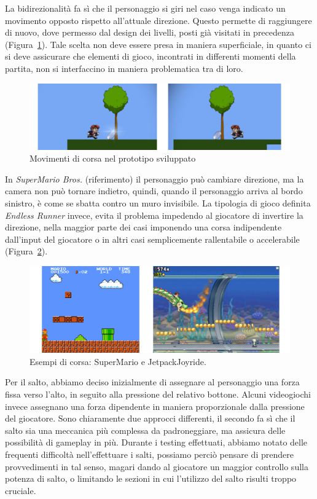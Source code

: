 La bidirezionalità fa sì che il personaggio si giri nel caso venga indicato un movimento opposto rispetto all’attuale direzione. Questo permette di raggiungere di nuovo, dove permesso dal design dei livelli, posti già visitati in precedenza (Figura~\ref{fig:platform_corsa}). Tale scelta non deve essere presa in maniera superficiale, in quanto ci si deve assicurare che elementi di gioco, incontrati in differenti momenti della partita, non si interfaccino in maniera problematica tra di loro. 
\begin{figure}%
	\centering
	\includegraphics[width= \columnwidth]{images/gameDesign/03.jpg}
	\caption{Movimenti di corsa nel prototipo sviluppato}
	\label{fig:platform_corsa}
\end{figure}
In \textit{SuperMario Bros.} (riferimento) il personaggio può cambiare direzione, ma la camera non può tornare indietro, quindi, quando il personaggio arriva al bordo sinistro, è come se sbatta contro un muro invisibile.
La tipologia di gioco definita \textit{Endless Runner} invece, evita il problema impedendo al giocatore di invertire la direzione, nella maggior parte dei casi imponendo una corsa indipendente dall’input del giocatore o in altri casi semplicemente rallentabile o accelerabile (Figura~\ref{fig:platform_corsa_reali}).

\begin{figure}%
	\centering
	\includegraphics[width= \columnwidth]{images/gameDesign/04.jpg}
	\caption{Esempi di corsa: SuperMario e JetpackJoyride.}
	\label{fig:platform_corsa_reali}
\end{figure}

Per il salto, abbiamo deciso inizialmente di assegnare al personaggio una forza fissa verso l’alto, in seguito alla pressione del relativo bottone. Alcuni videogiochi invece assegnano una forza dipendente in maniera proporzionale dalla pressione del giocatore. Sono chiaramente due approcci differenti, il secondo fa sì che il salto sia una meccanica più complessa da padroneggiare, ma assicura delle possibilità di gameplay in più.
Durante i testing effettuati, abbiamo notato delle frequenti difficoltà nell’effettuare i salti, possiamo perciò pensare di prendere provvedimenti in tal senso, magari dando al giocatore un maggior controllo sulla potenza di salto, o limitando le sezioni in cui l’utilizzo del salto risulti troppo cruciale.

